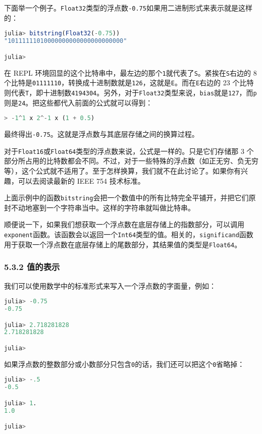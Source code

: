 下面举一个例子。\verb|Float32|类型的浮点数\verb|-0.75|如果用二进制形式来表示就是这样的：
\begin{lstlisting}[language=julia]
julia> bitstring(Float32(-0.75))
"10111111010000000000000000000000"

julia> 
\end{lstlisting}

在 REPL 环境回显的这个比特串中，最左边的那个\verb|1|就代表了\verb|S|。紧挨在\verb|S|右边的 8 个比特是\verb|01111110|，转换成十进制数就是\verb|126|，这就是\verb|E|。而在\verb|E|右边的 23 个比特则代表\verb|T|，即十进制数\verb|4194304|。另外，对于\verb|Float32|类型来说，\verb|bias|就是\verb|127|，而\verb|p|则是\verb|24|。把这些都代入前面的公式就可以得到：
\begin{lstlisting}[language=julia]
> -1^1 x 2^-1 x (1 + 0.5)
\end{lstlisting}
最终得出\verb|-0.75|。这就是浮点数与其底层存储之间的换算过程。

对于\verb|Float16|或\verb|Float64|类型的浮点数来说，公式是一样的。只是它们存储那 3 个部分所占用的比特数都会不同。不过，对于一些特殊的浮点数（如正无穷、负无穷等），这个公式就不适用了。至于怎样换算，我们就不在此讨论了。如果你有兴趣，可以去阅读最新的 IEEE 754 技术标准。

上面示例中的函数\verb|bitstring|会把一个数值中的所有比特完全平铺开，并把它们原封不动地塞到一个字符串当中。这样的字符串就叫做比特串。

顺便说一下，如果我们想获取一个浮点数在底层存储上的指数部分，可以调用\verb|exponent|函数。该函数会以返回一个\verb|Int64|类型的值。相关的，\verb|significand|函数用于获取一个浮点数在底层存储上的尾数部分，其结果值的类型是\verb|Float64|。

\subsubsection{5.3.2 值的表示}

我们可以使用数学中的标准形式来写入一个浮点数的字面量，例如：
\begin{lstlisting}[language=julia]
julia> -0.75
-0.75

julia> 2.718281828
2.718281828

julia> 
\end{lstlisting}

如果浮点数的整数部分或小数部分只包含\verb|0|的话，我们还可以把这个\verb|0|省略掉：
\begin{lstlisting}[language=julia]
julia> -.5
-0.5

julia> 1.
1.0

julia> 
\end{lstlisting}

